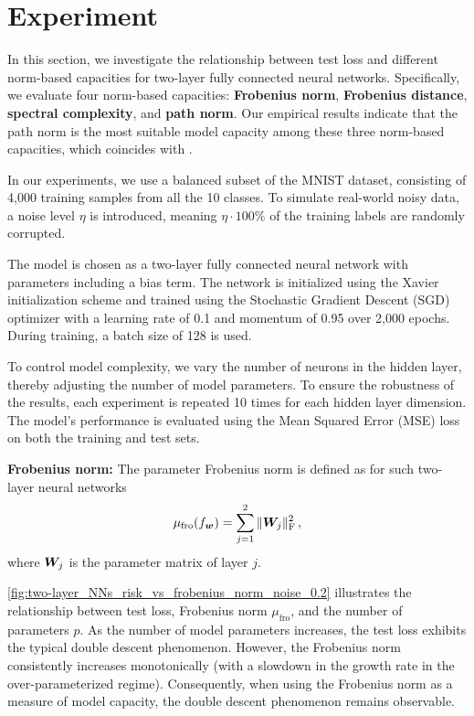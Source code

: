 \section{Experiment}
\label{app:experiment}

In this section, we investigate the relationship between test loss and different norm-based capacities for two-layer fully connected neural networks. Specifically, we evaluate four norm-based capacities: \textbf{Frobenius norm}, \textbf{Frobenius distance}, \textbf{spectral complexity}, and \textbf{path norm}. Our empirical results indicate that the path norm is the most suitable model capacity among these three norm-based capacities, which coincides with 
\citet{jiang2019fantastic}.

In our experiments, we use a balanced subset of the MNIST dataset, consisting of 4,000 training samples from all the 10 classes. To simulate real-world noisy data, a noise level $\eta$ is introduced, meaning $\eta \cdot 100\%$ of the training labels are randomly corrupted. 

The model is chosen as a two-layer fully connected neural network with parameters including a bias term. The network is initialized using the Xavier initialization scheme and trained using the Stochastic Gradient Descent (SGD) optimizer with a learning rate of 0.1 and momentum of 0.95 over 2,000 epochs. During training, a batch size of 128 is used. 

To control model complexity, we vary the number of neurons in the hidden layer, thereby adjusting the number of model parameters. To ensure the robustness of the results, each experiment is repeated 10 times for each hidden layer dimension. The model’s performance is evaluated using the Mean Squared Error (MSE) loss on both the training and test sets.

{\bf Frobenius norm:}
The parameter Frobenius norm is defined as for such two-layer neural networks
\[
\mu_{\text{fro}}(f_{\boldsymbol w}) = \sum_{j=1}^{2} \|{\boldsymbol W}_j\|_{\mathrm{F}}^2\,,
\]
where \({\boldsymbol W}_j\) is the parameter matrix of layer \(j\).

\cref{fig:two-layer_NNs_risk_vs_frobenius_norm_noise_0.2} illustrates the relationship between test loss, Frobenius norm \(\mu_{\text{fro}}\), and the number of parameters \(p\). As the number of model parameters increases, the test loss exhibits the typical double descent phenomenon. However, the Frobenius norm consistently increases monotonically (with a slowdown in the growth rate in the over-parameterized regime). Consequently, when using the Frobenius norm as a measure of model capacity, the double descent phenomenon remains observable.



